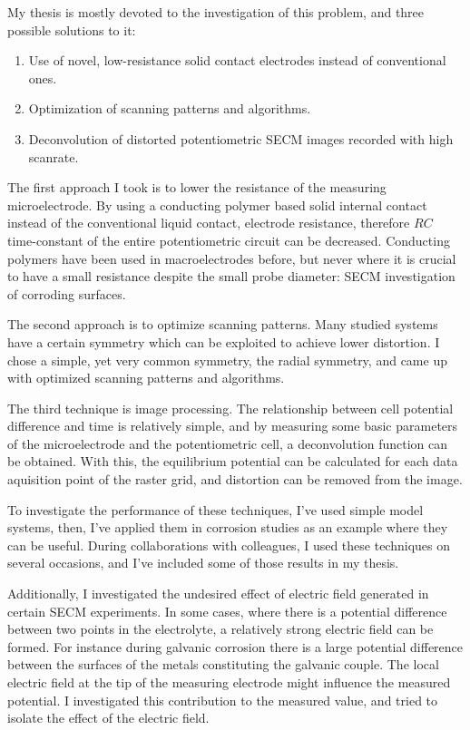 My thesis is mostly devoted to the investigation of this problem, and three possible solutions to it:

\begin{enumerate}
\item Use of novel, low-resistance solid contact electrodes instead of conventional ones.
\item Optimization of scanning patterns and algorithms.
\item Deconvolution of distorted potentiometric SECM images recorded with high scanrate.
\end{enumerate}

The first approach I took is to lower the resistance of the measuring microelectrode.
By using a conducting polymer based solid internal contact instead of the conventional liquid contact, electrode resistance, therefore $RC$ time-constant of the entire potentiometric circuit can be decreased.
Conducting polymers have been used in macroelectrodes before, but never where it is crucial to have a small resistance despite the small probe diameter: SECM investigation of corroding surfaces.

The second approach is to optimize scanning patterns.
Many studied systems have a certain symmetry which can be exploited to achieve lower distortion.
I chose a simple, yet very common symmetry, the radial symmetry, and came up with optimized scanning patterns and algorithms.

The third technique is image processing.
The relationship between cell potential difference and time is relatively simple, and by measuring some basic parameters of the microelectrode and the potentiometric cell, a deconvolution function can be obtained.
With this, the equilibrium potential can be calculated for each data aquisition point of the raster grid, and distortion can be removed from the image.

To investigate the performance of these techniques, I've used simple model systems, then, I've applied them in corrosion studies as an example where they can be useful.
During collaborations with colleagues, I used these techniques on several occasions, and I've included some of those results in my thesis.

Additionally, I investigated the undesired effect of electric field generated in certain SECM experiments.
In some cases, where there is a potential difference between two points in the electrolyte, a relatively strong electric field can be formed.
For instance during galvanic corrosion there is a large potential difference between the surfaces of the metals constituting the galvanic couple.
The local electric field at the tip of the measuring electrode might influence the measured potential.
I investigated this contribution to the measured value, and tried to isolate the effect of the electric field.
